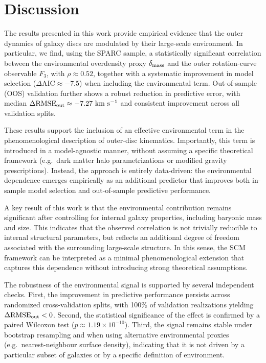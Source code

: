 \section{Discussion}

The results presented in this work provide empirical evidence that the outer dynamics of galaxy discs are modulated by their large-scale environment. In particular, we find, using the SPARC sample, a statistically significant correlation between the environmental overdensity proxy $\delta_{\rm mass}$ and the outer rotation-curve observable $F_3$, with $\rho \approx 0.52$, together with a systematic improvement in model selection ($\Delta\mathrm{AIC} \approx -7.5$) when including the environmental term. Out-of-sample (OOS) validation further shows a robust reduction in predictive error, with median $\Delta\mathrm{RMSE}_{\rm out} \approx -7.27\ \mathrm{km\ s^{-1}}$ and consistent improvement across all validation splits.

These results support the inclusion of an effective environmental term in the phenomenological description of outer-disc kinematics. Importantly, this term is introduced in a model-agnostic manner, without assuming a specific theoretical framework (e.g.\ dark matter halo parametrizations or modified gravity prescriptions). Instead, the approach is entirely data-driven: the environmental dependence emerges empirically as an additional predictor that improves both in-sample model selection and out-of-sample predictive performance.

A key result of this work is that the environmental contribution remains significant after controlling for internal galaxy properties, including baryonic mass and size. This indicates that the observed correlation is not trivially reducible to internal structural parameters, but reflects an additional degree of freedom associated with the surrounding large-scale structure. In this sense, the SCM framework can be interpreted as a minimal phenomenological extension that captures this dependence without introducing strong theoretical assumptions.

The robustness of the environmental signal is supported by several independent checks. First, the improvement in predictive performance persists across randomized cross-validation splits, with 100\% of validation realizations yielding $\Delta\mathrm{RMSE}_{\rm out} < 0$. Second, the statistical significance of the effect is confirmed by a paired Wilcoxon test ($p \approx 1.19 \times 10^{-10}$). Third, the signal remains stable under bootstrap resampling and when using alternative environmental proxies (e.g.\ nearest-neighbour surface density), indicating that it is not driven by a particular subset of galaxies or by a specific definition of environment.

